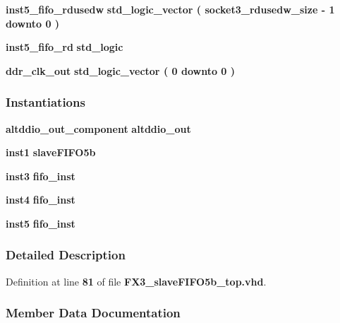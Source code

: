 \begin{DoxyCompactItemize}
\item 
{\bf inst5\+\_\+fifo\+\_\+rdusedw} {\bfseries \textcolor{comment}{std\+\_\+logic\+\_\+vector}\textcolor{vhdlchar}{ }\textcolor{vhdlchar}{(}\textcolor{vhdlchar}{ }\textcolor{vhdlchar}{ }\textcolor{vhdlchar}{ }\textcolor{vhdlchar}{ }{\bfseries {\bf socket3\+\_\+rdusedw\+\_\+size}} \textcolor{vhdlchar}{-\/}\textcolor{vhdlchar}{ } \textcolor{vhdldigit}{1} \textcolor{vhdlchar}{ }\textcolor{keywordflow}{downto}\textcolor{vhdlchar}{ }\textcolor{vhdlchar}{ } \textcolor{vhdldigit}{0} \textcolor{vhdlchar}{ }\textcolor{vhdlchar}{)}\textcolor{vhdlchar}{ }} 
\item 
{\bf inst5\+\_\+fifo\+\_\+rd} {\bfseries \textcolor{comment}{std\+\_\+logic}\textcolor{vhdlchar}{ }} 
\item 
{\bf ddr\+\_\+clk\+\_\+out} {\bfseries \textcolor{comment}{std\+\_\+logic\+\_\+vector}\textcolor{vhdlchar}{ }\textcolor{vhdlchar}{(}\textcolor{vhdlchar}{ }\textcolor{vhdlchar}{ } \textcolor{vhdldigit}{0} \textcolor{vhdlchar}{ }\textcolor{keywordflow}{downto}\textcolor{vhdlchar}{ }\textcolor{vhdlchar}{ } \textcolor{vhdldigit}{0} \textcolor{vhdlchar}{ }\textcolor{vhdlchar}{)}\textcolor{vhdlchar}{ }} 
\end{DoxyCompactItemize}
\subsubsection*{Instantiations}
 \begin{DoxyCompactItemize}
\item 
{\bf altddio\+\_\+out\+\_\+component}  {\bfseries altddio\+\_\+out}   
\item 
{\bf inst1}  {\bfseries slave\+F\+I\+F\+O5b}   
\item 
{\bf inst3}  {\bfseries fifo\+\_\+inst}   
\item 
{\bf inst4}  {\bfseries fifo\+\_\+inst}   
\item 
{\bf inst5}  {\bfseries fifo\+\_\+inst}   
\end{DoxyCompactItemize}


\subsubsection{Detailed Description}


Definition at line {\bf 81} of file {\bf F\+X3\+\_\+slave\+F\+I\+F\+O5b\+\_\+top.\+vhd}.



\subsubsection{Member Data Documentation}
